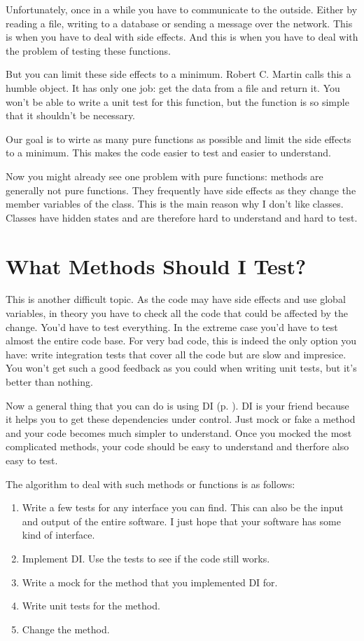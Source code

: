 Unfortunately, once in a while you have to communicate to the outside. Either by reading a file, writing to a database or sending a message over the network. This is when you have to deal with side effects. And this is when you have to deal with the problem of testing these functions.

But you can limit these side effects to a minimum. Robert C. Martin calls this a humble object. It has only one job: get the data from a file and return it. You won't be able to write a unit test for this function, but the function is so simple that it shouldn't be necessary.

Our goal is to wirte as many pure functions as possible and limit the side effects to a minimum. This makes the code easier to test and easier to understand.

Now you might already see one problem with pure functions: methods are generally not pure functions. They frequently have side effects as they change the member variables of the class. This is the main reason why I don't like classes. Classes have hidden states and are therefore hard to understand and hard to test.


\section{What Methods Should I Test?}

This is another difficult topic. As the code may have side effects and use global variables, in theory you have to check all the code that could be affected by the change. You'd have to test everything. In the extreme case you'd have to test almost the entire code base. For very bad code, this is indeed the only option you have: write integration tests that cover all the code but are slow and impresice. You won't get such a good feedback as you could when writing unit tests, but it's better than nothing.

Now a general thing that you can do is using DI (p. \pageref{sec:dependency_injection}). DI is your friend because it helps you to get these dependencies under control. Just mock or fake a method and your code becomes much simpler to understand. Once you mocked the most complicated methods, your code should be easy to understand and therfore also easy to test.

The algorithm to deal with such methods or functions is as follows:
\begin{enumerate}
    \item Write a few tests for any interface you can find. This can also be the input and output of the entire software. I just hope that your software has some kind of interface.
    \item Implement DI. Use the tests to see if the code still works.
    \item Write a mock for the method that you implemented DI for.
    \item Write unit tests for the method.
    \item Change the method.
\end{enumerate}


